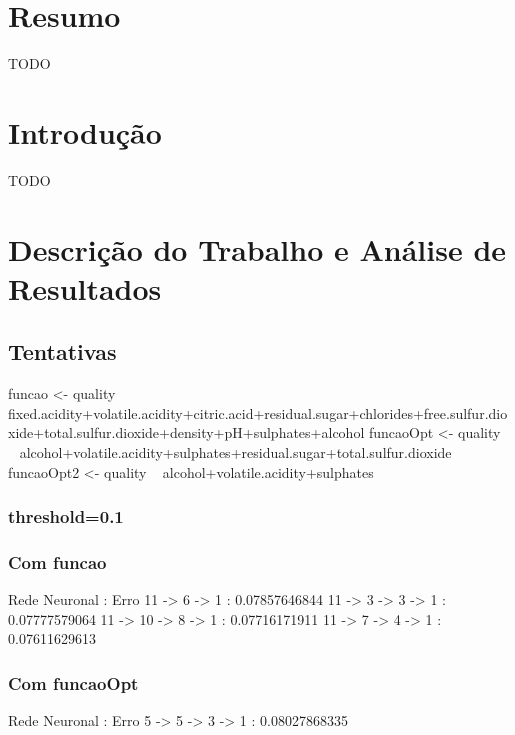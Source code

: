 \documentclass{article}
\begin{document}
{\section{Resumo}
{\color{red}TODO}
\vspace*{\fill}

\newpage

\vspace*{\fill}
\tableofcontents
\vspace*{\fill}

\newpage

\vspace*{\fill}
\section{Introdução}
{\color{red}TODO}
\vspace*{\fill}

\newpage

\section{Descrição do Trabalho e Análise de Resultados}

\subsection{Tentativas}

funcao <- quality ~ fixed.acidity+volatile.acidity+citric.acid+residual.sugar+chlorides+free.sulfur.dioxide+total.sulfur.dioxide+density+pH+sulphates+alcohol
funcaoOpt <- quality ~ alcohol+volatile.acidity+sulphates+residual.sugar+total.sulfur.dioxide
funcaoOpt2 <- quality ~ alcohol+volatile.acidity+sulphates

\subsubsection{threshold=0.1}
\subsubsection{Com funcao}
Rede Neuronal : Erro
11 -> 6 -> 1 : 0.07857646844
11 -> 3 -> 3 -> 1 : 0.07777579064
11 -> 10 -> 8 -> 1 : 0.07716171911
11 -> 7 -> 4 -> 1 : 0.07611629613

\subsubsection{Com funcaoOpt}
Rede Neuronal : Erro
5 -> 5 -> 3 -> 1 : 0.08027868335

}
\end{document}
